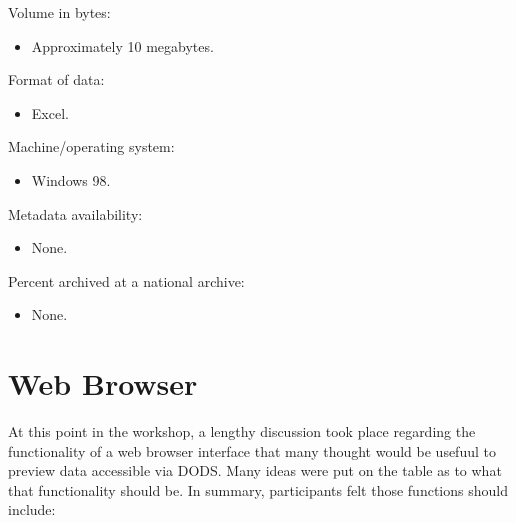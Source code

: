Volume in bytes:
\begin{itemize}
  \item Approximately 10 megabytes.
\end{itemize}

Format of data:
\begin{itemize}
  \item Excel.
\end{itemize}

Machine/operating system:
\begin{itemize}
  \item Windows 98.
\end{itemize}

Metadata availability:
\begin{itemize}
  \item None.
\end{itemize}

Percent archived at a national archive:
\begin{itemize}
  \item None.
\end{itemize}

\section{Web Browser}

At this point in the workshop, a lengthy discussion took place
regarding the functionality of a web browser interface that many
thought would be usefuul to preview data accessible via DODS.  Many
ideas were put on the table as to what that functionality should be.
In summary, participants felt those functions should include:

